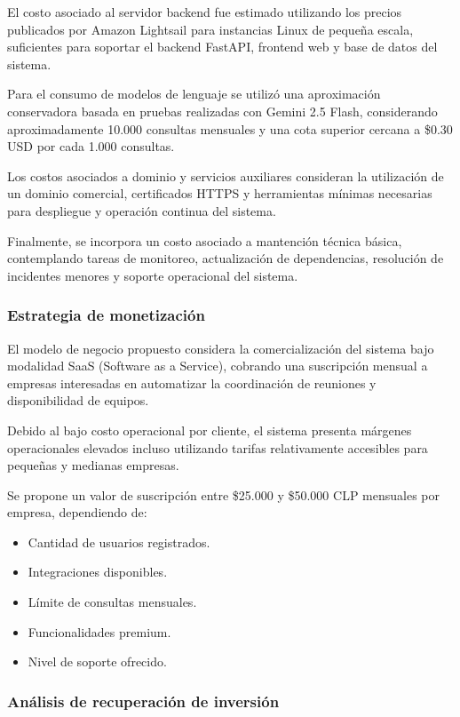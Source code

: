 El costo asociado al servidor backend fue estimado utilizando los precios publicados por Amazon Lightsail para instancias Linux de pequeña escala, suficientes para soportar el backend FastAPI, frontend web y base de datos del sistema.

Para el consumo de modelos de lenguaje se utilizó una aproximación conservadora basada en pruebas realizadas con Gemini 2.5 Flash, considerando aproximadamente 10.000 consultas mensuales y una cota superior cercana a \$0.30 USD por cada 1.000 consultas.

Los costos asociados a dominio y servicios auxiliares consideran la utilización de un dominio comercial, certificados HTTPS y herramientas mínimas necesarias para despliegue y operación continua del sistema.

Finalmente, se incorpora un costo asociado a mantención técnica básica, contemplando tareas de monitoreo, actualización de dependencias, resolución de incidentes menores y soporte operacional del sistema.

\subsubsection{Estrategia de monetización}

El modelo de negocio propuesto considera la comercialización del sistema bajo modalidad SaaS (Software as a Service), cobrando una suscripción mensual a empresas interesadas en automatizar la coordinación de reuniones y disponibilidad de equipos.

Debido al bajo costo operacional por cliente, el sistema presenta márgenes operacionales elevados incluso utilizando tarifas relativamente accesibles para pequeñas y medianas empresas.

Se propone un valor de suscripción entre \$25.000 y \$50.000 CLP mensuales por empresa, dependiendo de:

\begin{itemize}
    \item Cantidad de usuarios registrados.
    \item Integraciones disponibles.
    \item Límite de consultas mensuales.
    \item Funcionalidades premium.
    \item Nivel de soporte ofrecido.
\end{itemize}

\subsubsection{Análisis de recuperación de inversión}

